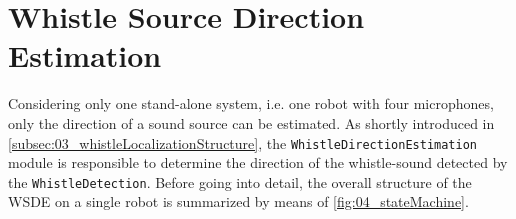 \section{Whistle Source Direction Estimation}
\label{subsec:03_directionEstimation}

Considering only one stand-alone system, i.e. one robot with four microphones,
only the direction of a sound source can be
estimated.
As shortly introduced in \cref{subsec:03_whistleLocalizationStructure},
the \lstinline!WhistleDirectionEstimation! module is responsible to
determine the direction of the whistle-sound detected by the \lstinline!WhistleDetection!.
Before going into detail, the overall structure of the \ac{WSDE} on a single robot
is summarized by means of \cref{fig:04_stateMachine}.

